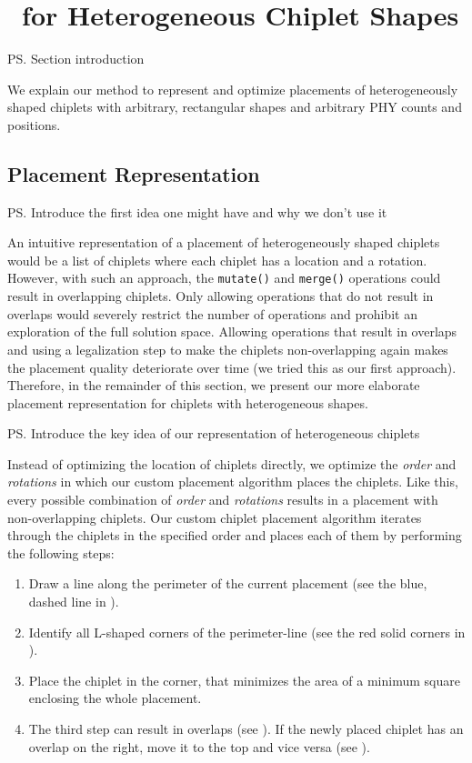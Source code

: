 \section{\name~for Heterogeneous Chiplet Shapes}
\label{sec:hetero}

\ps{Section introduction}

We explain our method to represent and optimize placements of heterogeneously shaped chiplets with arbitrary, rectangular shapes and arbitrary PHY counts and positions.

\subsection{Placement Representation}
\label{ssec:hetero-repr}


\ps{Introduce the first idea one might have and why we don't use it}

An intuitive representation of a placement of heterogeneously shaped chiplets would be a list of chiplets where each chiplet has a location and a rotation.
However, with such an approach, the \texttt{mutate()} and \texttt{merge()} operations could result in overlapping chiplets.
Only allowing operations that do not result in overlaps would severely restrict the number of operations and prohibit an exploration of the full solution space.
Allowing operations that result in overlaps and using a legalization step to make the chiplets non-overlapping again makes the placement quality deteriorate over time (we tried this as our first approach).
Therefore, in the remainder of this section, we present our more elaborate placement representation for chiplets with heterogeneous shapes.

\ps{Introduce the key idea of our representation of heterogeneous chiplets}

Instead of optimizing the location of chiplets directly, we optimize the \emph{order} and \emph{rotations} in which our custom placement algorithm places the chiplets.
Like this, every possible combination of \emph{order} and \emph{rotations} results in a placement with non-overlapping chiplets.
Our custom chiplet placement algorithm iterates through the chiplets in the specified order and places each of them by performing the following steps:


\begin{enumerate}[leftmargin=*, label={Step \arabic*:}]
	\item	Draw a line along the perimeter of the current placement (see the blue, dashed line in ).			
	\item	Identify all L-shaped corners of the perimeter-line (see the red solid corners in ).
	\item	Place the chiplet in the corner, that minimizes the area of a minimum square enclosing the whole placement.
	\item	The third step can result in overlaps (see ).
			If the newly placed chiplet has an overlap on the right, move it to the top and vice versa (see ).
\end{enumerate}


